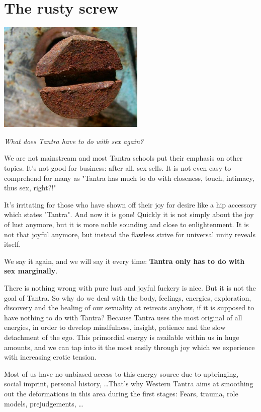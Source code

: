\section{The rusty screw}

\begin{center}
\includegraphics[width=7cm]{images/17_screw.jpg}
\end{center}

\textit{What does Tantra have to do with sex again?}

We are not mainstream and most Tantra schools put their emphasis on other topics. It's not good for business: after all, sex sells. It is not even easy to comprehend for many as "Tantra has much to do with closeness, touch, intimacy, thus sex, right?!"

It's irritating for those who have shown off their joy for desire like a hip accessory which states "Tantra". And now it is gone! Quickly it is not simply about the joy of lust anymore, but it is more noble sounding and close to enlightenment. It is not that joyful anymore, but instead the flawless strive for universal unity reveals itself.

We say it again, and we will say it every time: \textbf{Tantra only has to do with sex marginally}.

There is nothing wrong with pure lust and joyful fuckery is nice. But it is not the goal of Tantra. So why do we deal with the body, feelings, energies, exploration, discovery and the healing of our sexuality at retreats anyhow, if it is supposed to have nothing to do with Tantra? Because Tantra uses the most original of all energies, in order to develop mindfulness, insight, patience and the slow detachment of the ego. This primordial energy is available within us in huge amounts, and we can tap into it the most easily through joy which we experience with increasing erotic tension.

Most of us have no unbiased access to this energy source due to upbringing, social imprint, personal history, \ldots That's why Western Tantra aims at smoothing out the deformations in this area during the first stages: Fears, trauma, role models, prejudgements, \ldots

